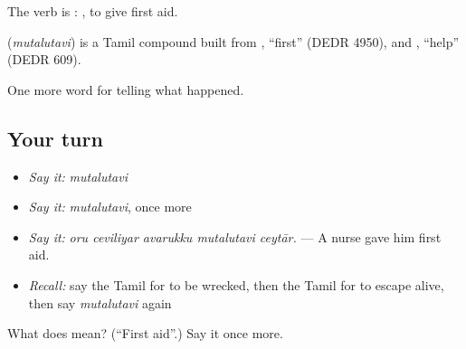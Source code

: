 The verb is :  , to give first aid.

\begin{cousinweb}
\textbf{} (\emph{mutalutavi}) is a Tamil compound built from , \textquotedblleft{}first\textquotedblright{} (DEDR 4950), and , \textquotedblleft{}help\textquotedblright{} (DEDR 609).
\end{cousinweb}

\begin{grammarlens}[title={What you've built}]
One more word for telling what happened.
\end{grammarlens}

\subsection*{Your turn}
\begin{itemize}
\raggedright
  \item \emph{Say it:} \emph{mutalutavi}
  \item \emph{Say it:} \emph{mutalutavi}, once more
  \item \emph{Say it:} \emph{oru ceviliyar avarukku mutalutavi ceytār.} — A nurse gave him first aid.
  \item \emph{Recall:} say the Tamil for to be wrecked, then the Tamil for to escape alive, then say \emph{mutalutavi} again
\end{itemize}

\begin{tcolorbox}[breakable,colback=teal!4,colframe=teal!35!black,title={Before you move on}]
What does  mean? (\textquotedblleft{}First aid\textquotedblright{}.) Say it once more.
\end{tcolorbox}
